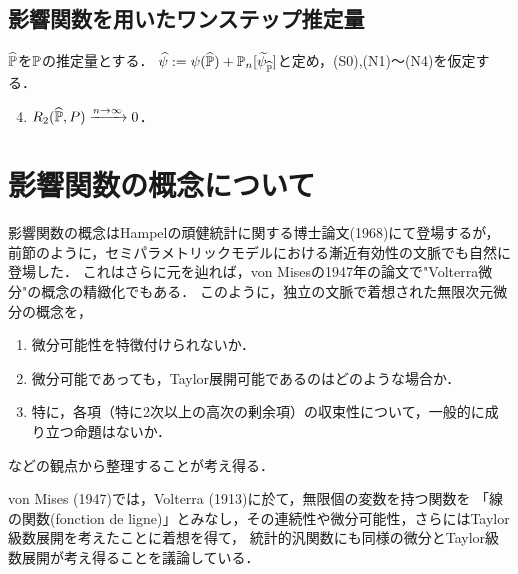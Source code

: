\documentclass[uplatex, dvipdfmx]{jsarticle}
\begin{document}
\subsection{影響関数を用いたワンステップ推定量}

\begin{theorem}\label{thm-semiparametric-one-step}
    $\widehat{\mathbb{P}}$を$\mathbb{P}$の推定量とする．
    $\widehat{\psi}:=\psi(\widehat{\mathbb{P}})+\mathbb{P}_n[\widetilde{\psi}_{\widehat{\mathbb{P}}}]$と定め，(S0),(N1)〜(N4)を仮定する．
    \begin{enumerate}[({N}1)]\setcounter{enumi}{3}
        \item $R_2(\widehat{\mathbb{P}},P)\xrightarrow{n\to\infty}0$．
    \end{enumerate}
\end{theorem}

\section{影響関数の概念について}

\begin{tcolorbox}[colframe=ForestGreen, colback=ForestGreen!10!white,breakable,colbacktitle=ForestGreen!40!white,coltitle=black,fonttitle=\bfseries\sffamily,
title=]
    影響関数の概念はHampelの頑健統計に関する博士論文(1968)\cite{Hampel68}にて登場するが，
    前節のように，セミパラメトリックモデルにおける漸近有効性の文脈でも自然に登場した．
    これはさらに元を辿れば，von Misesの1947年の論文で"Volterra微分"の概念の精緻化でもある．
    このように，独立の文脈で着想された無限次元微分の概念を，
    \begin{enumerate}
        \item 微分可能性を特徴付けられないか．
        \item 微分可能であっても，Taylor展開可能であるのはどのような場合か．
        \item 特に，各項（特に2次以上の高次の剰余項）の収束性について，一般的に成り立つ命題はないか．
    \end{enumerate}
    などの観点から整理することが考え得る．
\end{tcolorbox}

\begin{history}
    von Mises (1947)では，Volterra (1913)\cite{Vito Volterra}に於て，無限個の変数を持つ関数を
    「線の関数(fonction de ligne)」とみなし，その連続性や微分可能性，さらにはTaylor級数展開を考えたことに着想を得て，
    統計的汎関数にも同様の微分とTaylor級数展開が考え得ることを議論している．
\end{history}
\end{document}
